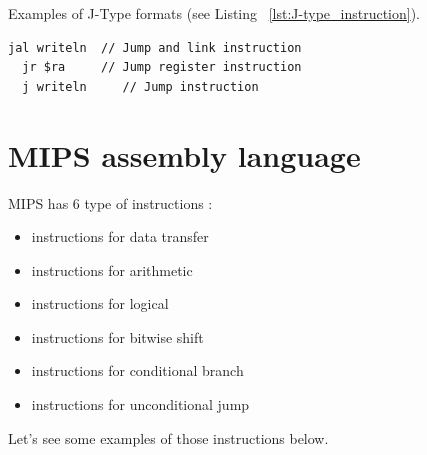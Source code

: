 \documentclass[
  oneside,
  11pt, a4paper,
  footinclude=true,
  headinclude=true,
  cleardoublepage=empty
]{scrbook}
\begin{document}
Examples of J-Type formats (see Listing ~\ref{lst:J-type_instruction}).

\begin{lstlisting}[caption={Examples of J-Type instruction},label={lst:J-type_instruction}]
  jal writeln  // Jump and link instruction
  jr $ra	 // Jump register instruction
  j writeln     // Jump instruction
\end{lstlisting}


\section{MIPS assembly language}

MIPS has 6 type of instructions :

\begin{itemize}
  \item instructions for data transfer
  \item instructions for arithmetic
  \item instructions for logical
  \item instructions for bitwise shift
  \item instructions for conditional branch
  \item instructions for unconditional jump
\end{itemize}

Let's see some examples of those instructions below.

\newpage
\end{document}
